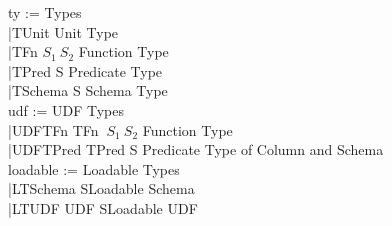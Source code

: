 \documentclass{article}
\begin{document}
\begin{frame}{}
\centering
	\begin{flushright}
	ty := \hfill \quad Types \hfill \\
	\quad |TUnit \hfill Unit Type\hfill \\
   	\quad |TFn \:$S_1 \:S_2$ \hfill Function Type \hfill \\
	\quad |TPred \:S \hfill Predicate Type\hfill \\
	\quad |TSchema \:S \hfill Schema Type \hfill \\[3ex]
	udf := \hfill \quad UDF Types\hfill \\
	\quad |UDFTFn TFn $\:S_1 \:S_2$ \hfill Function Type\hfill \\
   	\quad |UDFTPred TPred \:S \hfill Predicate Type \:of \:Column and Schema \hfill \\[3ex] 
	loadable := \hfill \quad Loadable Types\hfill \\
	\quad |LTSchema \:S\hfill Loadable Schema\hfill \\
   	\quad |LTUDF UDF \:S\hfill Loadable UDF\hfill \\
	
	\end{flushright}
\end{frame}
\end{document}
